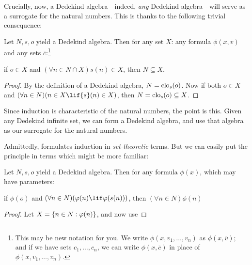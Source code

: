 \documentclass[../../../include/open-logic-section]{subfiles}
\begin{document}

Crucially, now, a Dedekind algebra---indeed, \emph{any} Dedekind
algebra---will serve as a surrogate for the natural numbers. This is
thanks to the following trivial consequence:

\begin{thm}
Let $N, s, o$ yield a Dedekind algebra. Then for any set $X$: %
any formula $\phi(x, \overline{v})$ and any sets
$\overline{c}$:\footnote{This may be new notation for you. We write
$\phi(x, v_1, \ldots, v_n)$ as $\phi(x, \overline{v})$; and if we have
sets $c_1, \ldots, c_n$, we can write $\phi(x, \overline{c})$ in place
of $\phi(x, v_1, \ldots, v_n)$.} 
	\begin{center}
		if $o \in X$ and $(\forall {n} \in N \cap X){s}({n}) \in X$, {then} $N \subseteq X$.
	\end{center}
\end{thm}

\begin{proof}
By the definition of a Dedekind algebra, $N = \mathrm{clo}_{s}(o)$.
Now if both ${o} \in X$ and $(\forall {n} \in N)(n \in X \lif
{s}({n}) \in X)$, then $N = \mathrm{clo}_{s}(o) \subseteq X$.
\end{proof}

Since induction is characteristic of the natural numbers, the point is
this. Given any Dedekind infinite set, we can form a Dedekind algebra,
and use that algebra as our surrogate for the natural numbers. 

Admittedly,  formulates induction in
\emph{set-theoretic} terms. But we can easily put the principle in
terms which might be more familiar:

\begin{cor}
Let $N, s, o$ yield a Dedekind algebra. Then for any formula
$\phi(x)$, which may have parameters:
\begin{center}
	if $\phi(o)$ and $(\forall {n} \in N)(\phi(n)\lif
	\phi({s}({n})))$, {then} $(\forall n \in N)\phi(n)$
\end{center}
\end{cor}

\begin{proof}
Let $X = \{ n \in N : \varphi(n) \}$, and now use
\end{proof}
\end{document}
